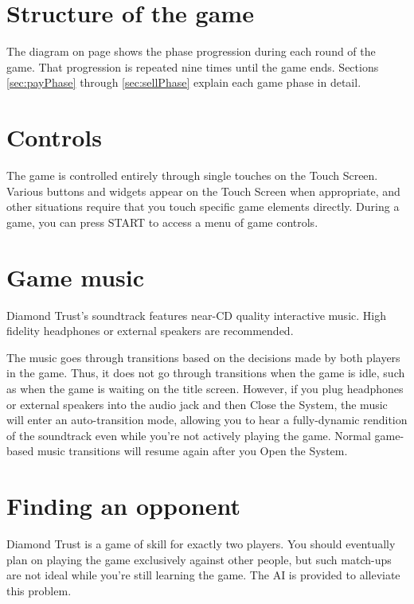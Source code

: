 \documentclass[8pt]{extbook}
\begin{document}
\section{Structure of the game}

The diagram on page \pageref{fig:gameFlow} shows the phase progression during each round of the game.  That progression is repeated nine times until the game ends.  Sections \ref{sec:payPhase} through \ref{sec:sellPhase} explain each game phase in detail.











\section{Controls}
The game is controlled entirely through single touches on the Touch Screen.  Various buttons and widgets appear on the Touch Screen when appropriate, and other situations require that you touch specific game elements directly.  During a game, you can press START to access a menu of game controls.

\section{Game music}

Diamond Trust's soundtrack features near-CD quality interactive music.  High fidelity headphones or external speakers are recommended.  

The music goes through transitions based on the decisions made by both players in the game.  Thus, it does not go through transitions when the game is idle, such as when the game is waiting on the title screen.  However, if you plug headphones or external speakers into the audio jack and then Close the System, the music will enter an auto-transition mode, allowing you to hear a fully-dynamic rendition of the soundtrack even while you're not actively playing the game.  Normal game-based music transitions will resume again after you Open the System.

\section{Finding an opponent}

Diamond Trust is a game of skill for exactly two players.  You should eventually plan on playing the game exclusively against other people, but such match-ups are not ideal while you're still learning the game.  The AI is provided to alleviate this problem.
\end{document}

